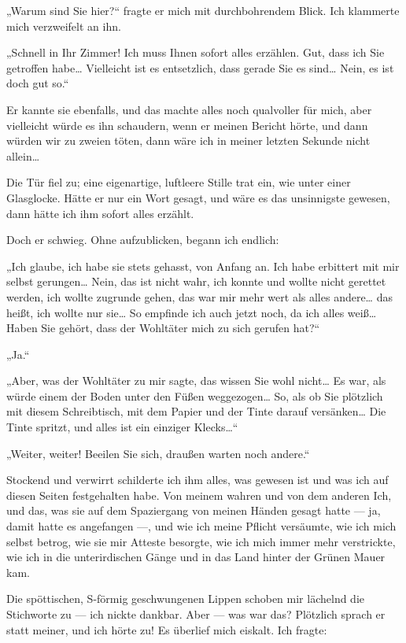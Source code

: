 „Warum sind Sie hier?“ fragte er mich mit durchbohrendem Blick. Ich
klammerte mich verzweifelt an ihn.

„Schnell in Ihr Zimmer! Ich muss
Ihnen sofort alles erzählen. Gut, dass ich Sie getroffen habe\ldots{}
Vielleicht ist es entsetzlich, dass gerade Sie es sind\ldots{} Nein, es
ist doch gut so.“

Er kannte sie ebenfalls, und das machte alles noch qualvoller für
mich, aber vielleicht würde es ihn schaudern, wenn er meinen
Bericht hörte, und dann würden wir zu zweien töten, dann wäre ich
in meiner letzten Sekunde nicht allein\ldots{}

Die Tür fiel zu; eine eigenartige, luftleere Stille trat ein, wie
unter einer Glasglocke. Hätte er nur ein Wort gesagt, und wäre es
das unsinnigste gewesen, dann hätte ich ihm sofort alles erzählt.

Doch er schwieg. Ohne aufzublicken, begann ich endlich:

„Ich
glaube, ich habe sie stets gehasst, von Anfang an. Ich habe
erbittert mit mir selbst gerungen\ldots{} Nein, das ist nicht wahr, ich
konnte und wollte nicht gerettet werden, ich wollte zugrunde gehen,
das war mir mehr wert als alles andere\ldots{} das heißt, ich wollte nur
sie\ldots{} So empfinde ich auch jetzt noch, da ich alles weiß\ldots{} Haben
Sie
gehört, dass der Wohltäter mich zu sich gerufen hat?“

„Ja.“

„Aber, was der Wohltäter zu mir sagte, das wissen Sie wohl nicht\ldots{}
Es war, als würde einem der Boden unter den Füßen weggezogen\ldots{} So,
als ob Sie plötzlich mit diesem Schreibtisch, mit dem Papier und
der Tinte darauf versänken\ldots{} Die Tinte spritzt, und alles ist ein
einziger Klecks\ldots{}“

„Weiter, weiter! Beeilen Sie sich, draußen warten noch andere.“

Stockend und verwirrt schilderte ich ihm alles, was gewesen ist und
was ich auf diesen Seiten festgehalten habe. Von meinem wahren und
von dem anderen Ich, und das, was sie auf dem Spaziergang von
meinen Händen gesagt hatte — ja, damit hatte es angefangen —, und
wie ich meine Pflicht versäumte, wie ich mich selbst betrog, wie
sie mir Atteste besorgte, wie ich mich immer mehr verstrickte, wie
ich in die unterirdischen Gänge und in das Land hinter der Grünen
Mauer kam.

Die spöttischen, S-förmig geschwungenen Lippen schoben
mir lächelnd die Stichworte zu — ich nickte dankbar. Aber — was war
das? Plötzlich sprach er statt meiner, und ich hörte zu! Es
überlief mich eiskalt. Ich fragte:

